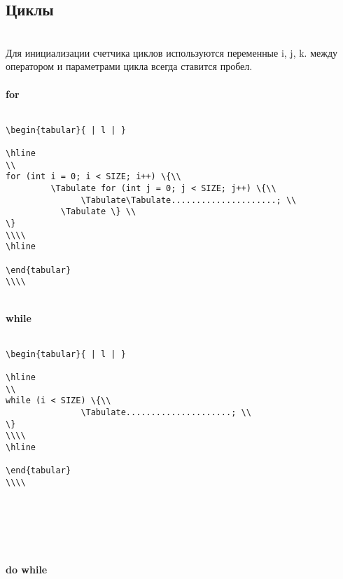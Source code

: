 \documentclass{article}
\begin{document}
\subsection{Циклы}\\
Для инициализации счетчика циклов используются переменные i, j, k. между оператором и параметрами цикла всегда ставится пробел.\cite{two}\\\\
\large \textbf{for}\\\\
\normalsize
\begin{lstlisting}
\begin{tabular}{ | l | }

\hline
\\
for (int i = 0; i < SIZE; i++) \{\\
         \Tabulate for (int j = 0; j < SIZE; j++) \{\\
               \Tabulate\Tabulate.....................; \\
           \Tabulate \} \\
\}
\\\\
\hline

\end{tabular}
\\\\
\end{lstlisting}
\\\large \textbf{while}\\\\
\normalsize
\begin{left}
\begin{lstlisting}
\begin{tabular}{ | l | }

\hline
\\
while (i < SIZE) \{\\
               \Tabulate.....................; \\
\}
\\\\
\hline

\end{tabular}
\\\\
\end{lstlisting}\\
\end{left}\\\\
\\\large \textbf{do while}\\\\
\end{document}
